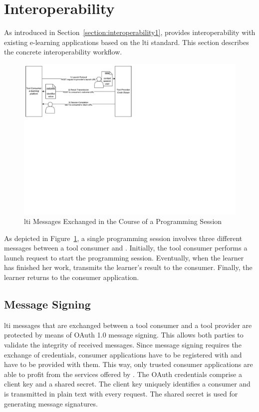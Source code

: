 \section{Interoperability}\label{section:interoperability2}

As introduced in Section~\ref{section:interoperability1}, \tool provides interoperability with existing e-learning applications based on the \gls{lti} standard. This section describes the concrete interoperability workflow.

\begin{figure}[t]
\centering
\includegraphics[clip=true, trim=0.1cm 10.3cm 11.1cm 0.2cm, width=\textwidth]{images/lti.pdf}
\caption{\gls{lti} Messages Exchanged in the Course of a Programming Session}
\label{figure:lti}
\end{figure}

As depicted in Figure~\ref{figure:lti}, a single programming session involves three different messages between a tool consumer and \tool. Initially, the tool consumer performs a launch request to start the programming session. Eventually, when the learner has finished her work, \tool transmits the learner's result to the consumer. Finally, the learner returns to the consumer application.

\subsection{Message Signing}

\Gls{lti} messages that are exchanged between a tool consumer and a tool provider are protected by means of OAuth 1.0 message signing. This allows both parties to validate the integrity of received messages. Since message signing requires the exchange of credentials, consumer applications have to be registered with \tool and have to be provided with them. This way, only trusted consumer applications are able to profit from the services offered by \tool. The OAuth credentials comprise a client key and a shared secret. The client key uniquely identifies a consumer and is transmitted in plain text with every request. The shared secret is used for generating message signatures.

